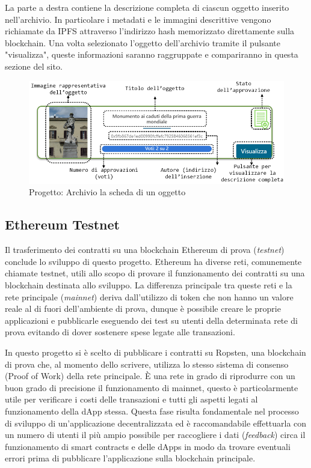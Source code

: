 La parte a destra contiene la descrizione completa di ciascun oggetto inserito nell'archivio. In particolare i metadati e le immagini descrittive vengono richiamate da IPFS attraverso l'indirizzo hash memorizzato direttamente sulla blockchain. Una volta selezionato l'oggetto dell'archivio tramite il pulsante "visualizza", queste informazioni saranno raggruppate e compariranno in questa sezione del sito. 

\begin{figure}[H]
\centering
\includegraphics[width=1\textwidth]{immagini/artworkFocusCommented.png}
\caption{Progetto: Archivio la scheda di un oggetto}
\label{fig:artworkFocus}
\end{figure}

\subsection{Ethereum Testnet}

Il trasferimento dei contratti su una blockchain Ethereum di prova (\emph{testnet}) conclude lo sviluppo di questo progetto. Ethereum ha diverse reti, comunemente chiamate testnet, utili allo scopo di provare il funzionamento dei contratti su una blockchain destinata allo sviluppo. La differenza principale tra queste reti e la rete principale (\emph{mainnet}) deriva dall’utilizzo di token che non hanno un valore reale al di fuori dell'ambiente di prova, dunque è possibile creare le proprie applicazioni e pubblicarle eseguendo dei test su utenti della determinata rete di prova evitando di dover sostenere spese legate alle transazioni.

In questo progetto si è scelto di pubblicare i contratti su Ropsten, una blockchain di prova che, al momento dello scrivere, utilizza lo stesso sistema di consenso (Proof of Work) della rete principale. È una rete in grado di riprodurre con un buon grado di precisione il funzionamento di mainnet, questo è particolarmente utile per verificare i costi delle transazioni e tutti gli aspetti legati al funzionamento della dApp stessa. Questa fase risulta fondamentale nel processo di sviluppo di un’applicazione decentralizzata ed è raccomandabile effettuarla con un numero di utenti il più ampio possibile per raccogliere i dati (\emph{feedback}) circa il funzionamento di smart contracts e delle dApps in modo da trovare eventuali errori prima di pubblicare l'applicazione sulla blockchain principale.